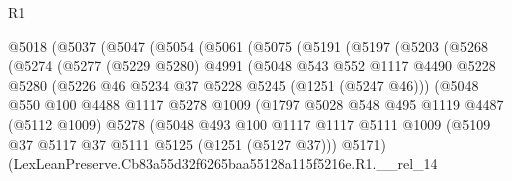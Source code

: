 \begin{lexlean}{R1}
\begin{coremodule}
                @5018
                  (@5037
                    (@5047
                      (@5054
                        (@5061
                          (@5075
                            (@5191
                              (@5197
                                (@5203
                                  (@5268
                                    (@5274
                                      (@5277
                                        (@5229 @5280)
                                        @4991
                                        (@5048
                                          @543
                                          @552
                                          @1117
                                          @4490
                                          @5228
                                          @5280
                                          (@5226 @46 @5234 @37 @5228 @5245 (@1251 (@5247 @46)))
                                          (@5048
                                            @550
                                            @100
                                            @4488
                                            @1117
                                            @5278
                                            @1009
                                            (@1797
                                              @5028
                                              @548
                                              @495
                                              @1119
                                              @4487
                                              (@5112 @1009)
                                              @5278
                                              (@5048
                                                @493
                                                @100
                                                @1117
                                                @1117
                                                @5111
                                                @1009
                                                (@5109
                                                  @37
                                                  @5117
                                                  @37
                                                  @5111
                                                  @5125
                                                  (@1251 (@5127 @37)))
                                                @5171)
                                              (LexLeanPreserve.Cb83a55d32f6265baa55128a115f5216e.R1.__rel_14

\end{coremodule}
\end{lexlean}
